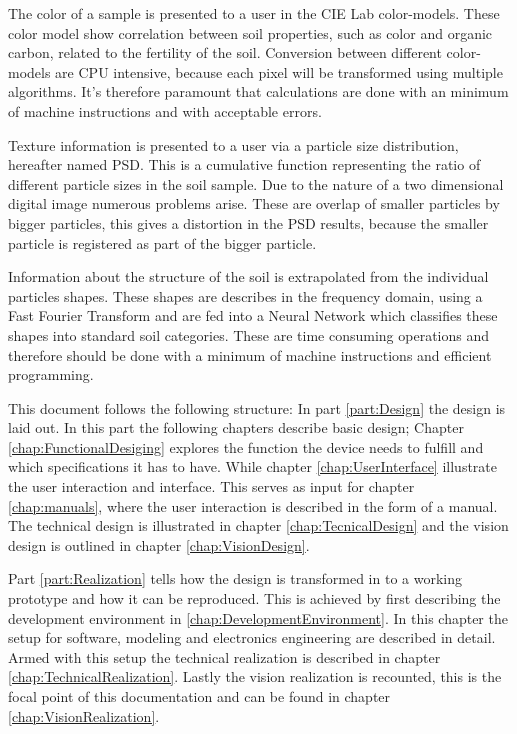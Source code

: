 \documentclass[11pt,fleqn,,a4paper,twoside,openright]{book}
\begin{document}
The color of a sample is presented to a user in the CIE Lab color-models. These color model show correlation between soil properties, such as color and organic carbon, related to the fertility of the soil. Conversion between different color-models are CPU intensive, because each pixel will be transformed using multiple algorithms. It's therefore paramount that calculations are done with an minimum of machine instructions and with acceptable errors.

Texture information is presented to a user via a particle size distribution, hereafter named PSD. This is a cumulative function representing the ratio of different particle sizes in the soil sample. Due to the nature of a two dimensional digital image numerous problems arise. These are overlap of smaller particles by bigger particles, this gives a distortion in the PSD results, because the smaller particle is registered as part of the bigger particle.

Information about the structure of the soil is extrapolated from the individual particles shapes. These shapes are describes in the frequency domain, using a Fast Fourier Transform and are fed into a Neural Network which classifies these shapes into standard soil categories. These are time consuming operations and therefore should be done with a minimum of machine instructions and efficient programming.

This document follows the following structure: In part \ref{part:Design} the design is laid out. In this part the following chapters describe basic design; Chapter \ref{chap:FunctionalDesiging} explores the function the device needs to fulfill and which specifications it has to have. While chapter \ref{chap:UserInterface} illustrate the user interaction and interface. This serves as input for chapter \ref{chap:manuals}, where the user interaction is described in the form of a manual. The technical design is illustrated in chapter \ref{chap:TecnicalDesign} and the vision design is outlined in chapter \ref{chap:VisionDesign}.

Part \ref{part:Realization} tells how the design is transformed in to a working prototype and how it can be reproduced. This is achieved by first describing the development environment in \ref{chap:DevelopmentEnvironment}. In this chapter the setup for software, modeling and electronics engineering are described in detail. Armed with this setup the technical realization is described in chapter \ref{chap:TechnicalRealization}. Lastly the vision realization is recounted, this is the focal point of this documentation and can be found in chapter \ref{chap:VisionRealization}.
\end{document}
